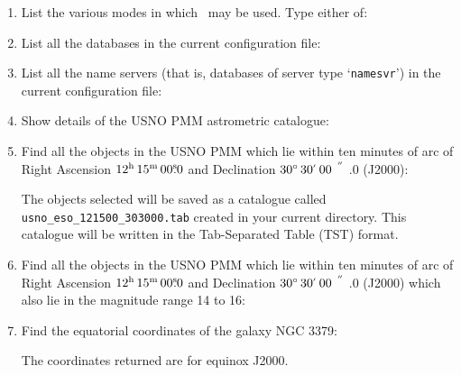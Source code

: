 \documentclass[twoside,11pt]{starlink}
\providecommand{\arcsec} {$\hspace{-0.05em}\raisebox{-0.5ex}
                     {$^{'\hspace{-0.1em}'}$}
                     \hspace{-0.7em}.\hspace{-0.05em}$}
\providecommand{\tsec}   {\mbox{$^{\rm s}\!\!.$}}
\providecommand{\hms}[4] {$#1^{\rm h}\,#2^{\rm m}\,#3\tsec#4$}
\providecommand{\dms}[4] {$#1^{\circ}\,#2\raisebox{-0.5ex}{$^{'}$}\,#3\arcsec#4$}
\providecommand{\catremote}{\htmlref{\texttt{catremote}}{CATREMOTE}}
\begin{document}
\begin{enumerate}

  \item List the various modes in which \catremote\ may be used.
   Type either of:

  \begin{terminalv}
  \end{terminalv}

  \item List all the databases in the current configuration file:

  \begin{terminalv}
  \end{terminalv}

  \item List all the name servers (that is, databases of server type
   `\texttt{namesvr}') in the current configuration file:

  \begin{terminalv}
  \end{terminalv}

  \item Show details of the USNO PMM astrometric catalogue:

  \begin{terminalv}
  \end{terminalv}

  \item Find all the objects in the USNO PMM which lie within ten
   minutes of arc of Right Ascension \hms{12}{15}{00}{0} and
   Declination \dms{30}{30}{00}{0} (J2000):

  \begin{terminalv}
  \end{terminalv}

   The objects selected will be saved as a catalogue called \texttt{usno\_eso\_121500\_303000.tab} created in your current directory.
   This catalogue will be written in the Tab-Separated Table (TST)
   format.

  \item Find all the objects in the USNO PMM which lie within ten
   minutes of arc of Right Ascension \hms{12}{15}{00}{0} and
   Declination \dms{30}{30}{00}{0} (J2000) which also lie in the
   magnitude range 14 to 16:

  \begin{terminalv}
  \end{terminalv}

  \item Find the equatorial coordinates of the galaxy NGC 3379:

  \begin{terminalv}
  \end{terminalv}

   The coordinates returned are for equinox J2000.

\end{enumerate}
\end{document}
